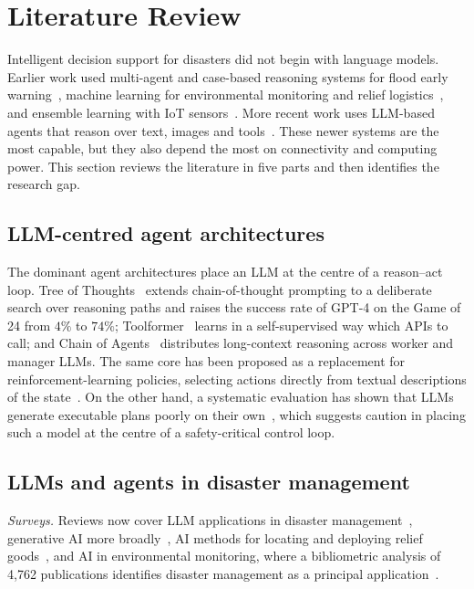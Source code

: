 \documentclass[journal]{IEEEtran}
\begin{document}
\section{Literature Review}\label{sec:lit}
Intelligent decision support for disasters did not begin with language models.
Earlier work used multi-agent and case-based reasoning systems for flood early
warning~\cite{rashid2024integrating}, machine learning for environmental
monitoring and relief logistics~\cite{alotaibi2024artificial,farazmehr2023locating},
and ensemble learning with IoT sensors~\cite{sen2026context}. More recent work
uses LLM-based agents that reason over text, images and
tools~\cite{xu2025large,saengtabtim2025harnessing}. These newer systems are the
most capable, but they also depend the most on connectivity and computing
power. This section reviews the literature in five parts and then identifies
the research gap.

\subsection{LLM-centred agent architectures}
The dominant agent architectures place an LLM at the centre of a
reason--act loop. Tree of Thoughts~\cite{yao2023tree} extends chain-of-thought
prompting to a deliberate search over reasoning paths and raises the success
rate of GPT-4 on the Game of 24 from $4\%$ to $74\%$;
Toolformer~\cite{schick2023toolformer} learns in a self-supervised way which
APIs to call; and Chain of Agents~\cite{zhang2024chain} distributes long-context
reasoning across worker and manager LLMs. The same core has been proposed as a
replacement for reinforcement-learning policies, selecting actions directly
from textual descriptions of the state~\cite{park2025optimizing}. On the other
hand, a systematic evaluation has shown that LLMs generate executable plans
poorly on their own~\cite{valmeekam2023planning}, which suggests caution in
placing such a model at the centre of a safety-critical control loop.

\subsection{LLMs and agents in disaster management}
\textit{Surveys.} Reviews now cover LLM applications in disaster
management~\cite{xu2025large}, generative AI more
broadly~\cite{saengtabtim2025harnessing}, AI methods for locating and deploying
relief goods~\cite{farazmehr2023locating}, and AI in environmental monitoring,
where a bibliometric analysis of 4{,}762 publications identifies disaster
management as a principal application~\cite{alotaibi2024artificial}.
\end{document}
